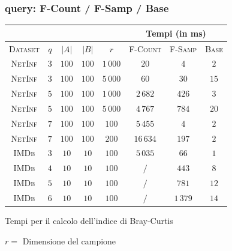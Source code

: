 \begin{frame}
	\frametitle{query: F-Count / F-Samp / Base}
	\centering
	\begin{table}[ht]
		\centering
		\begin{tabular}{|c|c|c|c|c|c|c|c|}
			\cline{6-8}
			\multicolumn{5}{c|}{} & \multicolumn{3}{c|}{Tempi (in ms)} \\ \hline
			\textsc{Dataset} & $q$ & $|A|$ & $|B|$ & $r$      & \textsc{F-Count} 	& \textsc{F-Samp} & \textsc{Base} \\ \hline \hline
			\textsc{NetInf}  & $3$ & $100$ & $100$ & $1\,000$ & $20$             	& $4$               & $2$           \\ \hline
			\textsc{NetInf}  & $3$ & $100$ & $100$ & $5\,000$ & $60$             	& $30$              & $15$          \\ \hline \hline
			\textsc{NetInf}  & $5$ & $100$ & $100$ & $1\,000$ & $2\,682$         	& $426$             & $3$           \\ \hline
			\textsc{NetInf}  & $5$ & $100$ & $100$ & $5\,000$ & $4\,767$         	& $784$             & $20$          \\ \hline \hline
			\textsc{NetInf}  & $7$ & $100$ & $100$ & $100$    & $5\,455$ 			& $4$               & $2$           \\ \hline
			\textsc{NetInf}  & $7$ & $100$ & $100$ & $200$    & $16\,634$        	& $197$             & $2$           \\ \hline \hline
			\textsc{IMDb}    & $3$ & $10$  & $10$  & $100$    & $5\,035$         	& $66$              & $1$           \\ \hline
			\textsc{IMDb}    & $4$ & $10$  & $10$  & $100$    & $/$              	& $443$             & $8$           \\ \hline
			\textsc{IMDb}    & $5$ & $10$  & $10$  & $100$    & $/$              	& $781$             & $12$          \\ \hline
			\textsc{IMDb}    & $6$ & $10$  & $10$  & $100$    & $/$              	& $1\,379$          & $14$          \\ \hline
		\end{tabular}
		\medskip
		
		Tempi per il calcolo dell'indice di Bray-Curtis
		
		$r =$ Dimensione del campione
	\end{table}
\end{frame}


